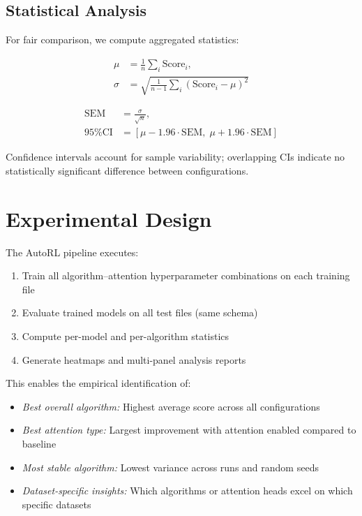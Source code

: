 \documentclass[11pt]{article}
\begin{document}
\subsection{Statistical Analysis}
For fair comparison, we compute aggregated statistics:

\begin{equation}
\begin{aligned}
\mu &= \frac{1}{n} \sum_{i} \mathrm{Score}_i, \\
\sigma &= \sqrt{\frac{1}{n-1} \sum_{i} (\mathrm{Score}_i - \mu)^2}
\end{aligned}
\end{equation}

\begin{equation}
\begin{aligned}
\mathrm{SEM} &= \frac{\sigma}{\sqrt{n}}, \\
\text{95\% CI} &= [\mu - 1.96 \cdot \mathrm{SEM},\; \mu + 1.96 \cdot \mathrm{SEM}]
\end{aligned}
\end{equation}

Confidence intervals account for sample variability; overlapping CIs indicate no statistically significant difference between configurations.

\section{Experimental Design}
The AutoRL pipeline executes:
\begin{enumerate}
\item Train all algorithm--attention hyperparameter combinations on each training file
\item Evaluate trained models on all test files (same schema)
\item Compute per-model and per-algorithm statistics
\item Generate heatmaps and multi-panel analysis reports
\end{enumerate}

This enables the empirical identification of:
\begin{itemize}
\item \emph{Best overall algorithm:} Highest average score across all configurations
\item \emph{Best attention type:} Largest improvement with attention enabled compared to baseline
\item \emph{Most stable algorithm:} Lowest variance across runs and random seeds
\item \emph{Dataset-specific insights:} Which algorithms or attention heads excel on which specific datasets
\end{itemize}
\end{document}
